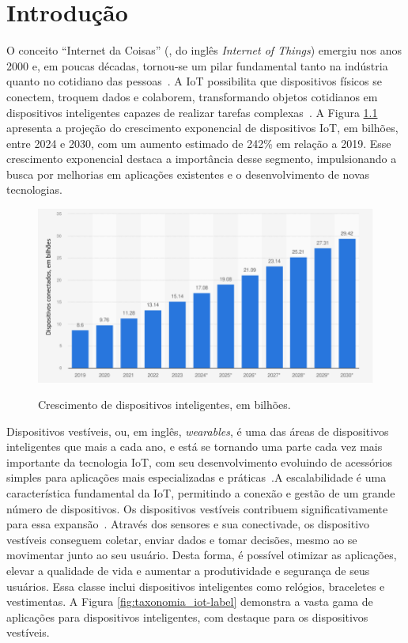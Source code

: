 \chapter{Introdução}
\label{chap:introducao}

O conceito ``Internet da Coisas'' (, do inglês \textit{Internet of Things}) emergiu nos anos 2000 e, em poucas décadas, tornou-se um pilar fundamental tanto na indústria quanto no cotidiano das pessoas~\cite{Farahsari2022}. A IoT possibilita que dispositivos físicos se conectem, troquem dados e colaborem, transformando objetos cotidianos em dispositivos inteligentes capazes de realizar tarefas complexas~\cite{Fuqaha2015}. A Figura \ref{fig:crescimento_iot-label} apresenta a projeção do crescimento exponencial de dispositivos IoT, em bilhões, entre 2024 e 2030, com um aumento estimado de 242\% em relação a 2019. Esse crescimento exponencial destaca a importância desse segmento, impulsionando a busca por melhorias em aplicações existentes e o desenvolvimento de novas tecnologias.

\begin{figure}[ht]
    \centering
    \caption{Crescimento de dispositivos inteligentes, em bilhões.}
    \includegraphics[width=\textwidth]{../Imagens/crescimento_iot.png}
    \label{fig:crescimento_iot-label}
\end{figure}


Dispositivos vestíveis, ou, em inglês, \textit{wearables}, é uma das áreas de dispositivos inteligentes que mais a cada ano, e está se tornando uma parte cada vez mais importante da tecnologia IoT, com seu desenvolvimento evoluindo de acessórios simples para aplicações mais especializadas e práticas~\cite{Dian2020}.A escalabilidade é uma característica fundamental da IoT, permitindo a conexão e gestão de um grande número de dispositivos. Os dispositivos vestíveis contribuem significativamente para essa expansão~\cite{Islam2023}. Através dos sensores e sua conectivade, os dispositivo vestíveis conseguem coletar, enviar dados e tomar decisões, mesmo ao se movimentar junto ao seu usuário. Desta forma, é possível otimizar as aplicações, elevar a qualidade de vida e aumentar a produtividade e segurança de seus usuários. Essa classe inclui dispositivos inteligentes como relógios, braceletes e vestimentas. A Figura \ref{fig:taxonomia_iot-label} demonstra a vasta gama de aplicações para dispositivos inteligentes, com destaque para os dispositivos vestíveis.

